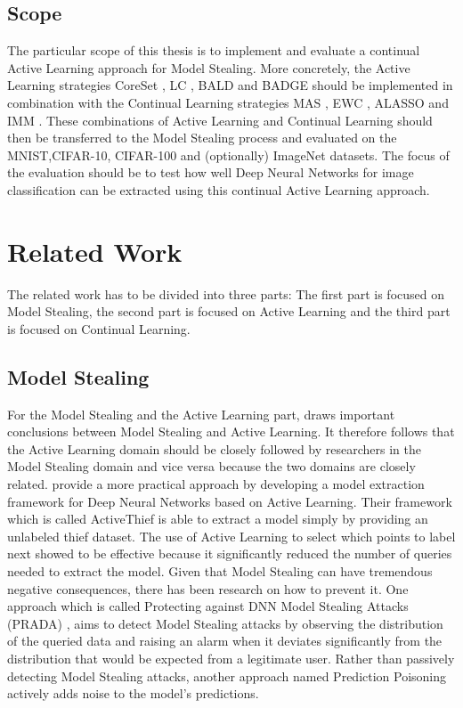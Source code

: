 \documentclass[expose, en]{thesis}
\begin{document}
\subsection{Scope}
The particular scope of this thesis is to implement and evaluate a continual Active Learning approach for Model Stealing.
More concretely, the Active Learning strategies CoreSet \cite{sener2017active}, LC \cite{lewis1995sequential}, BALD \cite{gal2017deep} 
and BADGE \cite{ash2019deep} should be implemented in combination
with the Continual Learning strategies MAS \cite{aljundi2018memory}, EWC \cite{kirkpatrick2017overcoming}, ALASSO \cite{park2019continual}
and IMM \cite{lee2017overcoming}. These combinations of Active Learning and Continual Learning should 
then be transferred to the Model Stealing process and evaluated on the MNIST,CIFAR-10, CIFAR-100 and (optionally) ImageNet datasets.
The focus of the evaluation should be to test how well Deep Neural Networks for image classification can be extracted using
this continual Active Learning approach.

\section{Related Work}
The related work has to be divided into three parts: The first part is focused on Model Stealing,
the second part is focused on Active Learning and the third part is focused on Continual Learning.

\subsection{Model Stealing}
For the Model Stealing and the Active Learning part, \cite{chandrasekaran2020exploring} draws important
conclusions between Model Stealing and Active Learning. It therefore follows that the Active Learning
domain should be closely followed by researchers in the Model Stealing domain and vice versa because the 
two domains are closely related. \cite{pal2020activethief} provide a more practical approach by developing
a model extraction framework for Deep Neural Networks based on Active Learning. Their framework which is called
ActiveThief is able to extract a model simply by providing an unlabeled thief dataset. The use of Active Learning to
select which points to label next showed to be effective because it significantly reduced the number of queries
needed to extract the model. Given that Model Stealing can have tremendous negative consequences, there has been research on
how to prevent it. One approach which is called Protecting against DNN Model Stealing Attacks (PRADA) \cite{juuti2019prada},
aims to detect Model Stealing attacks by observing the distribution of the queried data and raising an alarm when it deviates
significantly from the distribution that would be expected from a legitimate user. Rather than passively detecting Model Stealing
attacks, another approach named Prediction Poisoning \cite{orekondy2019prediction} actively adds noise to the model's predictions. 
\end{document}
